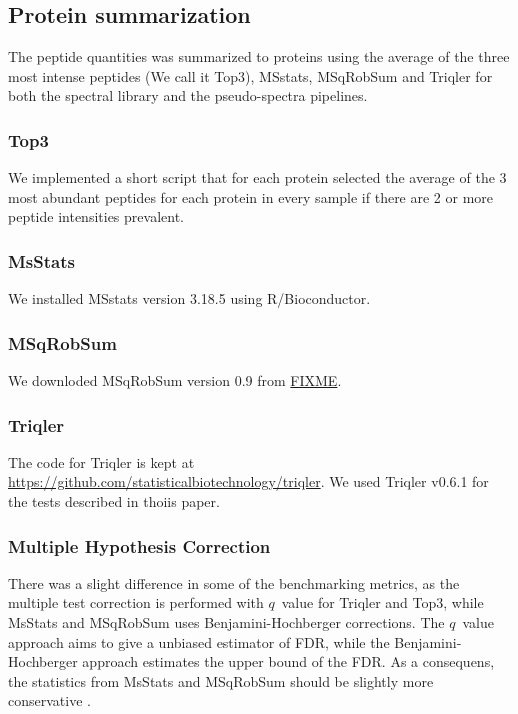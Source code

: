 \documentclass[10pt,letterpaper]{article}
\begin{document}
\subsection*{Protein summarization}

The peptide quantities was summarized to proteins using the average of the three most intense peptides (We call it Top3), MSstats, MSqRobSum and Triqler for both the spectral library and the pseudo-spectra pipelines. 

\subsubsection*{Top3}

We implemented a short script that for each protein selected the average of the 3 most abundant peptides for each protein in every sample if there are 2 or more peptide intensities prevalent. 



\subsubsection*{MsStats}

We installed MSstats version 3.18.5 using R/Bioconductor.

\subsubsection*{MSqRobSum}

We downloded MSqRobSum version 0.9 from \url{FIXME}.

\subsubsection*{Triqler}

The code for Triqler is kept at \url{https://github.com/statisticalbiotechnology/triqler}. We used Triqler v0.6.1 for the tests described in thoiis paper.

\subsubsection*{Multiple Hypothesis Correction}
There was a slight difference in some of the benchmarking metrics, as the multiple test correction is performed with $q$~value for Triqler and Top3, while MsStats and MSqRobSum uses Benjamini-Hochberger \cite{benjamini1995controlling} corrections. The $q$~value approach aims to give a unbiased estimator of FDR, while the Benjamini-Hochberger approach estimates the upper bound of the FDR. As a consequens, the statistics from MsStats and MSqRobSum should be slightly more conservative \cite{korthauer2019practical}.
\end{document}
